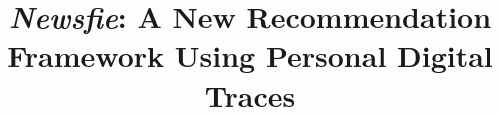 \documentclass[conference]{IEEEtran}
\begin{document}
%
\title{\textit{Newsfie}: A New Recommendation Framework Using Personal Digital Traces}

% 
\end{document}
